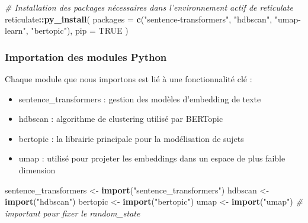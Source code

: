 \documentclass[
]{article}
\newenvironment{Shaded}{\begin{snugshade}}{\end{snugshade}}
\newcommand{\AttributeTok}[1]{\textcolor[rgb]{0.13,0.29,0.53}{#1}}
\newcommand{\CommentTok}[1]{\textcolor[rgb]{0.56,0.35,0.01}{\textit{#1}}}
\newcommand{\ConstantTok}[1]{\textcolor[rgb]{0.56,0.35,0.01}{#1}}
\newcommand{\FunctionTok}[1]{\textcolor[rgb]{0.13,0.29,0.53}{\textbf{#1}}}
\newcommand{\NormalTok}[1]{#1}
\newcommand{\OtherTok}[1]{\textcolor[rgb]{0.56,0.35,0.01}{#1}}
\newcommand{\SpecialCharTok}[1]{\textcolor[rgb]{0.81,0.36,0.00}{\textbf{#1}}}
\newcommand{\StringTok}[1]{\textcolor[rgb]{0.31,0.60,0.02}{#1}}
\providecommand{\tightlist}{%
  \setlength{\itemsep}{0pt}\setlength{\parskip}{0pt}}
\begin{document}
\begin{Shaded}
\begin{Highlighting}[]
\CommentTok{\# Installation des packages nécessaires dans l’environnement actif de reticulate}
\NormalTok{reticulate}\SpecialCharTok{::}\FunctionTok{py\_install}\NormalTok{(}
  \AttributeTok{packages =} \FunctionTok{c}\NormalTok{(}\StringTok{"sentence{-}transformers"}\NormalTok{, }\StringTok{"hdbscan"}\NormalTok{, }\StringTok{"umap{-}learn"}\NormalTok{, }\StringTok{"bertopic"}\NormalTok{),}
  \AttributeTok{pip =} \ConstantTok{TRUE}
\NormalTok{)}
\end{Highlighting}
\end{Shaded}

\subsubsection{Importation des modules
Python}\label{importation-des-modules-python}

Chaque module que nous importons est lié à une fonctionnalité clé :

\begin{itemize}
\tightlist
\item
  sentence\_transformers : gestion des modèles d'embedding de texte
\item
  hdbscan : algorithme de clustering utilisé par BERTopic
\item
  bertopic : la librairie principale pour la modélisation de sujets
\item
  umap : utilisé pour projeter les embeddings dans un espace de plus
  faible dimension
\end{itemize}

\begin{Shaded}
\begin{Highlighting}[]
\NormalTok{sentence\_transformers }\OtherTok{\textless{}{-}} \FunctionTok{import}\NormalTok{(}\StringTok{"sentence\_transformers"}\NormalTok{)}
\NormalTok{hdbscan }\OtherTok{\textless{}{-}} \FunctionTok{import}\NormalTok{(}\StringTok{"hdbscan"}\NormalTok{)}
\NormalTok{bertopic }\OtherTok{\textless{}{-}} \FunctionTok{import}\NormalTok{(}\StringTok{"bertopic"}\NormalTok{)}
\NormalTok{umap }\OtherTok{\textless{}{-}} \FunctionTok{import}\NormalTok{(}\StringTok{"umap"}\NormalTok{)  }\CommentTok{\# important pour fixer le random\_state}
\end{Highlighting}
\end{Shaded}

\begin{Shaded}
\end{Shaded}
\end{document}
